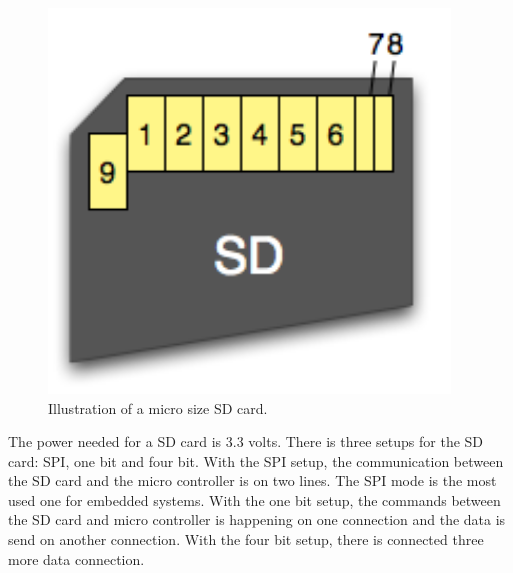 \begin{minipage}{\linewidth}
\begin{minipage}{0.65\linewidth}
\begin{table} [H]
\begin{tabular}{|l|l|l|l|}
				\end{tabular}							
			\end{table}			
      \end{minipage}
      \hspace{0.03\linewidth}
      \begin{minipage}{0.30\linewidth}
          \begin{figure}[H]
              \includegraphics[width=0.95\textwidth]{figures/sdcardpinout}
              \caption{Illustration of a micro size SD card.} %
              \label{SDcardpinout}
          \end{figure}
      \end{minipage}
      
  \end{minipage}



The power needed for a SD card is 3.3 volts. There is three setups for the SD card: SPI, one bit and four bit. With the SPI setup, the communication between the SD card and the micro controller is on two lines. The SPI mode is the most used one for embedded systems.
With the one bit setup, the commands between the SD card and micro controller is happening on one connection and the data is send on another connection. With the four bit setup, there is connected three more data connection.

